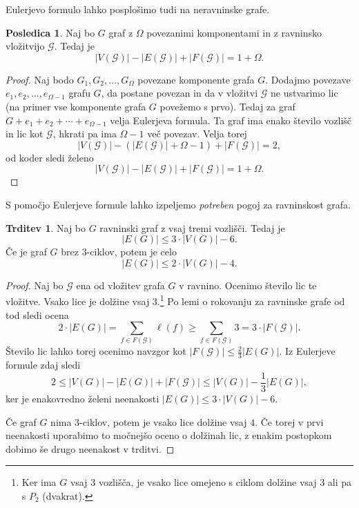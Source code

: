 \documentclass[11pt]{book}
\def\GG{\mathcal{G}}
\theoremstyle{definition}
\theoremstyle{zgled}
\theoremstyle{odprtproblem}
\theoremstyle{domacanaloga}
\newenvironment{dokaz}
    {\color{siva}\begin{proof}}
    {\end{proof}}
\theoremstyle{izrek}
\newtheorem*{trditev}{Trditev}
\newtheorem*{posledica}{Posledica}
\begin{document}
Eulerjevo formulo lahko posplošimo tudi na neravninske grafe.

\begin{posledica}
Naj bo $G$ graf z $\Omega$ povezanimi komponentami in z ravninsko vložitvijo $\GG$. Tedaj je
\[
    |V(\GG)| - |E(\GG)| + |F(\GG)| = 1 + \Omega.
\]
\end{posledica}
\begin{dokaz}
Naj bodo $G_1, G_2, \dots, G_\Omega$ povezane komponente grafa $G$. Dodajmo povezave $e_1, e_2, \dots, e_{\Omega - 1}$ grafu $G$, da postane povezan in da v vložitvi $\GG$ ne ustvarimo lic (na primer vse komponente grafa $G$ povežemo s prvo). Tedaj za graf $G + e_1 + e_2 + \cdots + e_{\Omega - 1}$ velja Eulerjeva formula. Ta graf ima enako število vozlišč in lic kot $\GG$, hkrati pa ima $\Omega-1$ več povezav. Velja torej
\[
    |V(\GG)| - (|E(\GG)| + \Omega - 1) + |F(\GG)| = 2,
\]
od koder sledi želeno
\[
    |V(\GG)| - |E(\GG)| + |F(\GG)| = 1 + \Omega.
\]
\end{dokaz}

S pomočjo Eulerjeve formule lahko izpeljemo \emph{potreben} pogoj za ravninskost grafa.

\begin{trditev}
    Naj bo $G$ ravninski graf z vsaj tremi vozlišči. Tedaj je
    \[
        |E(G)| \leq 3 \cdot |V(G)| - 6.
    \]
    Če je graf $G$ brez $3$-ciklov, potem je celo
    \[
        |E(G)| \leq 2 \cdot |V(G)| - 4.
    \]
\end{trditev}
\begin{dokaz}
    Naj bo $\GG$ ena od vložitev grafa $G$ v ravnino. Ocenimo število lic te vložitve. Vsako lice je dolžine vsaj $3$.\footnote{Ker ima $G$ vsaj $3$ vozlišča, je vsako lice omejeno s ciklom dolžine vsaj $3$ ali pa s $P_2$ (dvakrat).} Po lemi o rokovanju za ravninske grafe od tod sledi ocena
    \[
        2 \cdot |E(G)| = \sum_{f \in F(\GG)} \ell(f) \geq \sum_{f \in F(\GG)} 3 = 3 \cdot |F(\GG)|.
        \]
    Število lic lahko torej ocenimo navzgor kot $|F(\GG)| \leq \frac23 |E(G)|$. Iz Eulerjeve formule zdaj sledi
    \[
        2 \leq |V(G)| - |E(G)| + |F(\GG)| \leq |V(G)| - \frac13 |E(G)|,
    \]
    ker je enakovredno želeni neenakosti $|E(G)| \leq 3 \cdot |V(G)| - 6$.

    Če graf $G$ nima $3$-ciklov, potem je vsako lice dolžine vsaj $4$. Če torej v prvi neenakosti uporabimo to močnejšo oceno o dolžinah lic, z enakim postopkom dobimo še drugo neenakost v trditvi.
\end{dokaz}
\end{document}
